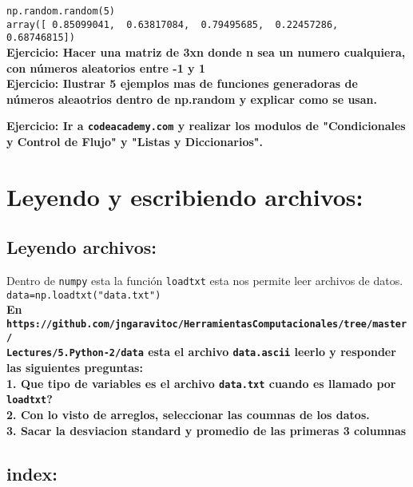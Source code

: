 \documentclass[12pt]{article}
\begin{document}
\verb+np.random.random(5)+ \\
\verb+array([ 0.85099041,  0.63817084,  0.79495685,  0.22457286,  0.68746815])+\\

{\bf Ejercicio: Hacer una matriz de 3xn donde n sea un numero cualquiera, con n\'umeros aleatorios entre 
-1 y 1}\\

{\bf Ejercicio: Ilustrar 5 ejemplos mas de funciones generadoras de n\'umeros aleaotrios dentro de np.random y explicar como se usan.}

{\bf Ejercicio: Ir a \verb+codeacademy.com+ y realizar los modulos de "Condicionales y Control de Flujo" y "Listas y Diccionarios".}

\section{Leyendo y escribiendo archivos:}

\subsection{Leyendo archivos:}

Dentro de \verb+numpy+ esta la funci\'on \verb+loadtxt+ esta nos permite leer archivos de datos. \\

\verb+data=np.loadtxt("data.txt")+\\

{\bf En \verb+https://github.com/jngaravitoc/HerramientasComputacionales/tree/master/+ \\
 \verb+Lectures/5.Python-2/data+ esta el archivo \verb+data.ascii+ leerlo y responder las 
siguientes preguntas:\\}
{\bf 1. Que tipo de variables es el archivo \verb+data.txt+ cuando es llamado por \verb+loadtxt+?}\\
{\bf 2. Con lo visto de arreglos, seleccionar las coumnas de los datos.}\\
{\bf 3. Sacar la desviacion standard y promedio de las primeras 3 columnas }

\subsection{index:}
\end{document}
